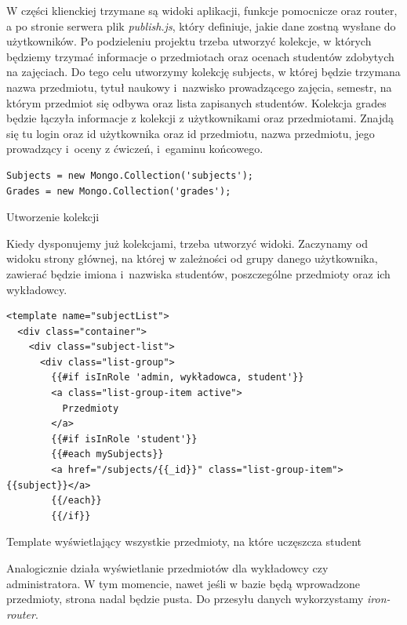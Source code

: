 \documentclass[openright]{xmgr}
\begin{document}
W części klienckiej trzymane są widoki aplikacji, funkcje pomocnicze oraz router, a po stronie serwera plik \textit{publish.js}, który definiuje, jakie dane zostną wysłane do użytkowników. Po podzieleniu projektu trzeba utworzyć kolekcje, w których będziemy trzymać informacje o przedmiotach oraz ocenach studentów zdobytych na zajęciach. Do tego celu utworzymy kolekcję subjects, w której będzie trzymana nazwa przedmiotu, tytuł naukowy i~nazwisko prowadzącego zajęcia, semestr, na którym przedmiot się odbywa oraz lista zapisanych studentów. Kolekcja grades będzie łączyła informacje z kolekcji z użytkownikami oraz przedmiotami. Znajdą się tu login oraz id użytkownika oraz id przedmiotu, nazwa przedmiotu, jego prowadzący i~oceny z ćwiczeń, i~egaminu końcowego.

\begin{listing}[H]
\begin{verbatim}
Subjects = new Mongo.Collection('subjects');
Grades = new Mongo.Collection('grades');
\end{verbatim}
\caption{Utworzenie kolekcji}
\end{listing}

\noindent Kiedy dysponujemy już kolekcjami, trzeba utworzyć widoki. Zaczynamy od widoku strony głównej, na której w zależności od grupy danego użytkownika, zawierać będzie imiona i~nazwiska studentów, poszczególne przedmioty oraz ich wykładowcy.

\begin{listing}
\begin{verbatim}
<template name="subjectList">
  <div class="container">
    <div class="subject-list">
      <div class="list-group">
        {{#if isInRole 'admin, wykładowca, student'}}
        <a class="list-group-item active">
          Przedmioty
        </a>
        {{#if isInRole 'student'}}
        {{#each mySubjects}}
        <a href="/subjects/{{_id}}" class="list-group-item">{{subject}}</a>
        {{/each}}
        {{/if}}
\end{verbatim}
\caption{Template wyświetlający wszystkie przedmioty, na które uczęszcza student}
\end{listing}

Analogicznie działa wyświetlanie przedmiotów dla wykładowcy czy administratora. W tym momencie, nawet jeśli w bazie będą wprowadzone przedmioty, strona nadal będzie pusta. Do przesyłu danych wykorzystamy \textit{iron-router}.
\end{document}
